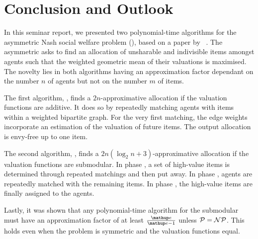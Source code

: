 \section{Conclusion and Outlook}
\label{sec:conclusion}

In this seminar report, we presented two polynomial-time algorithms for the asymmetric Nash social welfare problem (\NSW), based on a paper by \citeauthor{APNSWuSVþUM}~\cite{APNSWuSVþUM}.
The asymmetric \NSW{} asks to find an allocation of unsharable and indivisible items amongst agents such that the weighted geometric mean of their valuations is maximised.
The novelty lies in both algorithms having an approximation factor dependant on the number \(n\) of agents but not on the number \(m\) of items.

The first algorithm, \SMatch, finds a \(2n\)-approximative allocation if the valuation functions are additive.
It does so by repeatedly matching agents with items within a weighted bipartite graph.
For the very first matching, the edge weights incorporate an estimation of the valuation of future items.
The output allocation is envy-free up to one item.

The second algorithm, \RepReMatch, finds a \(2n(\log_2 n + 3)\)-approximative allocation if the valuation functions are submodular.
In phase \phasei, a set of high-value items is determined through repeated matchings and then put away.
In phase \phaseii, agents are repeatedly matched with the remaining items.
In phase \phaseiii, the high-value items are finally assigned to the agents.

Lastly, it was shown that any polynomial-time algorithm for the submodular \NSW{} must have an approximation factor of at least \(\frac{\euler}{\euler - 1}\) unless \(\mathcal{P} = \mathcal{NP}\).
This holds even when the problem is symmetric and the valuation functions equal.

\medskip

